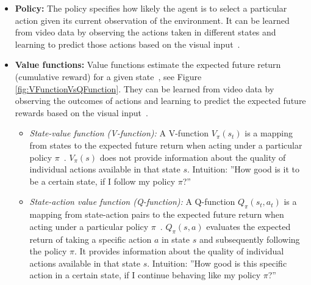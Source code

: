 \begin{itemize}
	\item \textbf{Policy:} The policy specifies how likely the agent is to select a particular action given its current observation of the environment.
	It can be learned from video data by observing the actions taken in different states and learning to predict those actions based on the visual input~\cite{Wulfmeier2023FoundationsFT}. 
	
	\item \textbf{Value functions:} Value functions estimate the expected future return (cumulative reward) for a given state~\cite{sutton2018reinforcement}, see Figure \ref{fig:VFunctionVsQFunction}. They can be learned from video data by observing the outcomes of actions and learning to predict the expected future rewards based on the visual input~\cite{Wulfmeier2023FoundationsFT}.

	\begin{itemize}
		\item \textit{State-value function (V-function):} 
		A V-function $V_\pi(s_t)$ is a mapping from states to the expected future return when acting under a particular policy $\pi$~\cite{sutton2018reinforcement}. $V_\pi(s)$ does not provide information about the quality of individual actions available in that state $s$. 
		Intuition: ''How good is it to be a certain state, if I follow my policy $\pi$?''


		\item \textit{State-action value function (Q-function):} 		
		A Q-function $Q_\pi(s_t,a_t)$ is a mapping from state-action pairs to the expected future return when acting under a particular policy $\pi$~\cite{sutton2018reinforcement}. $Q_\pi(s,a)$ evaluates the expected return of taking a specific action $a$ in state $s$ and subsequently following the policy $\pi$. It provides information about the quality of individual actions available in that state $s$.
		Intuition: ''How good is this specific action in a certain state, if I continue behaving like my policy $\pi$?''



\end{itemize}
\end{itemize}
